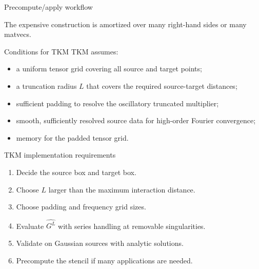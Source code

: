 \documentclass[aspectratio=169,11pt]{beamer}
\begin{document}
\begin{frame}{Precompute/apply workflow}
\small
\begin{center}
\end{center}

\vspace{2mm}
The expensive construction is amortized over many right-hand sides or many matvecs.
\end{frame}

\begin{frame}{Conditions for TKM}
\small
TKM assumes:
\begin{itemize}
  \item a uniform tensor grid covering all source and target points;
  \item a truncation radius $L$ that covers the required source-target distances;
  \item sufficient padding to resolve the oscillatory truncated multiplier;
  \item smooth, sufficiently resolved source data for high-order Fourier convergence;
  \item memory for the padded tensor grid.
\end{itemize}
\end{frame}

\begin{frame}{TKM implementation requirements}
\small
\begin{enumerate}
  \item Decide the source box and target box.
  \item Choose $L$ larger than the maximum interaction distance.
  \item Choose padding and frequency grid sizes.
  \item Evaluate $\widehat{G^L}$ with series handling at removable singularities.
  \item Validate on Gaussian sources with analytic solutions.
  \item Precompute the stencil if many applications are needed.
\end{enumerate}
\end{frame}
\end{document}
